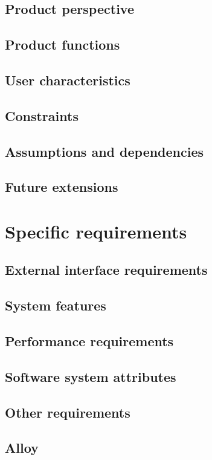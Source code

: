 \documentclass[12pt, a4paper]{report}
\begin{document}
\section{Product perspective}


\section{Product functions}


\section{User characteristics}


\section{Constraints}


\section{Assumptions and dependencies}


\section{Future extensions}


\chapter{Specific requirements}
\label{ch:requirements}

\section{External interface requirements}


\section{System features}


\section{Performance requirements}


\section{Software system attributes}


\section{Other requirements}


\section{Alloy}



\end{document}
